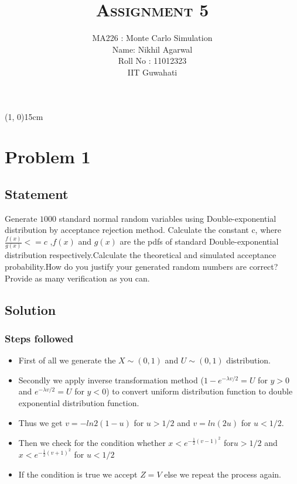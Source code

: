 \documentclass[10pt]{article}
\begin{document}
\title{\textbf{\textsc{Assignment 5}}}
\author{MA226 : Monte Carlo Simulation \\
			Name: Nikhil Agarwal \\
			Roll No : 11012323 \\
			IIT Guwahati}
\date{}
\maketitle

\begin{center}
	\line(1, 0){15cm}
\end{center}

\section{Problem 1}

\subsection{Statement}

Generate $ 1000 $ standard normal random variables using Double-exponential distribution by acceptance rejection method.
Calculate the constant c, where $\frac{f(x)}{g(x)} <=c $ ,$ f(x) $ and $ g(x) $ are the pdfs of standard Double-exponential distribution respectively.Calculate the theoretical and simulated acceptance probability.How do you justify your generated random numbers are correct? Provide as many verification as you can.

\subsection{Solution}

\subsubsection{Steps followed}
\begin{itemize}
\item First of all we generate the  $ X \sim  (0,1) $ and $ U \sim  (0,1) $ distribution.
\item Secondly we apply inverse transformation method ($ 1 - e^{-{\lambda}v/2} = U  $ for $ y>0 $ and $  e^{-{\lambda}v/2} = U  $ for $ y<0 $)   to convert uniform distribution function to double exponential distribution function.
\item Thus we get $ v= -ln2(1-u) $ for $  u>1/2 $ and $ v= ln(2u)$ for $ u<1/2 $.
\item Then we check for the condition  whether $ x< e^{-{\frac{1}{2}}(v-1)^2} $ for$ u>1/2 $ and  $ x< e^{-{\frac{1}{2}}(v+1)^2}$ for $ u<1/2 $
\item If the condition is true we accept $ Z=V $ else we repeat the process again.
\end{itemize}
\end{document}

